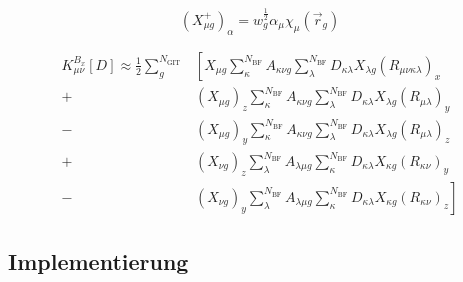 	\begin{equation}
	\left(X_{\mu g}^+\right)_\alpha=w_g^{\frac{1}{2}}\alpha_\mu\chi_\mu(\vec{r}_g)
	\end{equation}
	
	\begin{equation}
	\begin{aligned}
	K_{\mu\nu}^{B_x}[D]\approx\frac{1}{2}\sum_{g}^{N_{\textrm{GIT}}}&\left[X_{\mu g}\sum_\kappa^{N_{\textrm{BF}}}A_{\kappa\nu g}\sum_\lambda^{N_{\textrm{BF}}}D_{\kappa\lambda}X_{\lambda g}(R_{\mu\nu\kappa\lambda})_x\right.\\
	+&\left(X_{\mu g}\right)_z\sum_\kappa^{N_{\textrm{BF}}}A_{\kappa\nu g}\sum_\lambda^{N_{\textrm{BF}}}D_{\kappa\lambda}X_{\lambda g}(R_{\mu\lambda})_y\\
	-&\left(X_{\mu g}\right)_y\sum_\kappa^{N_{\textrm{BF}}}A_{\kappa\nu g}\sum_\lambda^{N_{\textrm{BF}}}D_{\kappa\lambda}X_{\lambda g}(R_{\mu\lambda})_z\\
	+&\left(X_{\nu g}\right)_z\sum_\lambda^{N_{\textrm{BF}}}A_{\lambda\mu g}\sum_\kappa^{N_{\textrm{BF}}}D_{\kappa\lambda}X_{\kappa g}(R_{\kappa\nu})_y\\
	-&\left.\left(X_{\nu g}\right)_y\sum_\lambda^{N_{\textrm{BF}}}A_{\lambda\mu g}\sum_\kappa^{N_{\textrm{BF}}}D_{\kappa\lambda}X_{\kappa g}(R_{\kappa\nu})_z\right]
	\end{aligned}
	\end{equation}
	

	

	

	\subsection{Implementierung}
	
